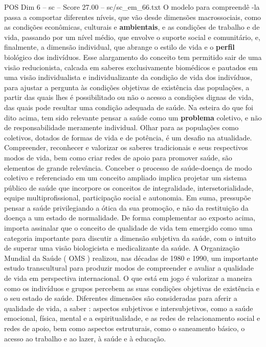 \begin{textsample}{POS Dim 6 – sc – Score 27.00 – sc/sc\_em\_66.txt}
O modelo para compreendê -la passa a comportar diferentes níveis, que vão desde dimensões macrossociais, como as condições econômicas, culturais e \textbf{ambientais}, e as condições de trabalho e de vida, passando por um nível médio, que envolve o suporte social e comunitário, e, finalmente, a dimensão individual, que abrange o estilo de vida e o \textbf{perfil} biológico dos indivíduos.
Esse alargamento do conceito tem permitido sair de uma visão reducionista, calcada em saberes exclusivamente biomédicos e pautados em uma visão individualista e individualizante da condição de vida dos indivíduos, para ajustar a pergunta às condições objetivas de existência das populações, a partir das quais lhes é possibilitado ou não o acesso a condições dignas de vida, das quais pode resultar uma condição adequada de saúde.
Na esteira do que foi dito acima, tem sido relevante pensar a saúde como um \textbf{problema} coletivo, e não de responsabilidade meramente individual.
Olhar para as populações como coletivos, dotados de formas de vida e de potência, é um desafio na atualidade.
Compreender, reconhecer e valorizar os saberes tradicionais e seus respectivos modos de vida, bem como criar redes de apoio para promover saúde, são elementos de grande relevância.
Conceber o processo de saúde-doença de modo coletivo e referenciado em um conceito ampliado implica projetar um sistema público de saúde que incorpore os conceitos de integralidade, intersetorialidade, equipe multiprofissional, participação social e autonomia.
Em suma, pressupõe pensar a saúde privilegiando a ótica da sua promoção, e não da restituição da doença a um estado de normalidade.
De forma complementar ao exposto acima, importa assinalar que o conceito de qualidade de vida tem emergido como uma categoria importante para discutir a dimensão subjetiva da saúde, com o intuito de superar uma visão biologicista e medicalizante da saúde.
A Organização Mundial da Saúde ( OMS ) realizou, nas décadas de 1980 e 1990, um importante estudo transcultural para produzir modos de compreender e avaliar a qualidade de vida em perspectiva internacional.
O que está em jogo é valorizar a maneira como os indivíduos e grupos percebem as suas condições objetivas de existência e o seu estado de saúde.
Diferentes dimensões são consideradas para aferir a qualidade de vida, a saber : aspectos subjetivos e intersubjetivos, como a saúde emocional, física, mental e a espiritualidade, e as redes de relacionamento social e redes de apoio, bem como aspectos estruturais, como o saneamento básico, o acesso ao trabalho e ao lazer, à saúde e à educação.

\end{textsample}
